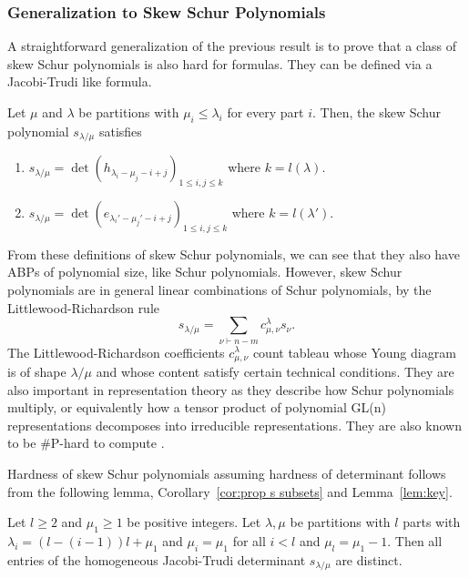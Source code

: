 %
%
%
%
%

%

 


\subsubsection{Generalization to Skew Schur Polynomials}

A straightforward generalization of the previous result is to prove that a class of skew Schur polynomials is also hard for formulas. They can be defined via a Jacobi-Trudi like formula. 

\begin{theorem}\label{def: skew schur definition}
Let $\mu$ and $\lambda$ be partitions with $\mu_i \leq \lambda_i$ for every part $i$. Then, the skew Schur polynomial $s_{\lambda/\mu}$ satisfies

\begin{enumerate}
\item $s_{\lambda/\mu} = \det(h_{\lambda_i - \mu_j - i + j})_{1\leq i, j \leq k}$ where $k = l(\lambda).$
\item $s_{\lambda/\mu} = \det(e_{\lambda_i' - \mu_j' - i+j})_{1 \leq i, j \leq k}$ where $k = l(\lambda')$.  
\end{enumerate}
\end{theorem}

From these definitions of skew Schur polynomials, we can see that they also have ABPs of polynomial size, like Schur polynomials. However, skew Schur polynomials are in general linear combinations of Schur polynomials, by the Littlewood-Richardson rule $$s_{\lambda / \mu} = \sum_{\nu \vdash n - m} c^\lambda_{\mu, \nu} s_\nu.$$ The Littlewood-Richardson coefficients $c^\lambda_{\mu, \nu}$ count tableau whose Young diagram is of shape $\lambda / \mu$ and whose content satisfy certain technical conditions. They are also important in representation theory as they describe how Schur polynomials multiply, or equivalently how a tensor product of polynomial GL(n) representations decomposes into irreducible representations. They are also known to be \#P-hard to compute \cite{r29}. 

Hardness of skew Schur polynomials assuming hardness of determinant follows from the following lemma, Corollary~\ref{cor:prop s subsets} and Lemma~\ref{lem:key}.
%
%
%

%
%
%
%

%
\begin{lemma}\label{lem: skew distinct}
Let $l \geq 2$ and $\mu_1 \geq 1$ be positive integers. Let $\lambda, \mu$ be partitions with $l$ parts with $\lambda_i = (l-(i-1))l + \mu_1$ and $\mu_i = \mu_1$ for all $i < l$ and $\mu_l = \mu_1 - 1$. Then all entries of the homogeneous Jacobi-Trudi determinant $s_{\lambda/\mu}$ are distinct. 
\end{lemma}

